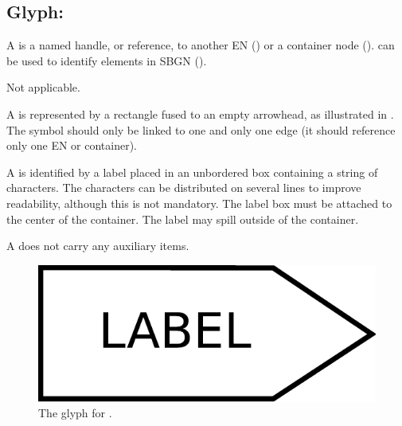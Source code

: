 
\color{red}

\subsection{Glyph: }
\label{sec:tag}

A  is a named handle, or reference, to another EN () or a container node ().   can be used to identify elements in SBGN  ().

\begin{glyphDescription}

\glyphSboTerm Not applicable.

\glyphContainer A  is represented by a rectangle fused to an empty arrowhead, as illustrated in .  The symbol should only be linked to one and only one edge (\ie it should reference only one EN or container).

\glyphLabel A  is identified by a label placed in an unbordered box containing a string of characters.  The characters can be distributed on several lines to improve readability, although this is not mandatory.  The label box must be attached to the center of the container.  The label may spill outside of the container.

\glyphAux A  does not carry any auxiliary items. 

\end{glyphDescription}

\begin{figure}[H]
  \centering
  \includegraphics[scale = 0.3]{images/tag}
  \caption{The \ER glyph for .}
  \label{fig:tag}
\end{figure}

\normalcolor


